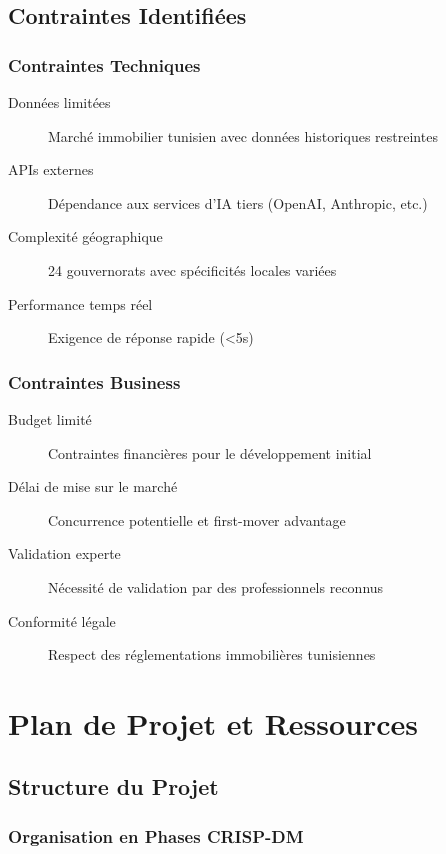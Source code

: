 \subsection{Contraintes Identifiées}
\label{subsec:contraintes}

\subsubsection{Contraintes Techniques}

\begin{description}
    \item[Données limitées] Marché immobilier tunisien avec données historiques restreintes
    \item[APIs externes] Dépendance aux services d'IA tiers (OpenAI, Anthropic, etc.)
    \item[Complexité géographique] 24 gouvernorats avec spécificités locales variées
    \item[Performance temps réel] Exigence de réponse rapide (<5s)
\end{description}

\subsubsection{Contraintes Business}

\begin{description}
    \item[Budget limité] Contraintes financières pour le développement initial
    \item[Délai de mise sur le marché] Concurrence potentielle et first-mover advantage
    \item[Validation experte] Nécessité de validation par des professionnels reconnus
    \item[Conformité légale] Respect des réglementations immobilières tunisiennes
\end{description}

\section{Plan de Projet et Ressources}
\label{sec:plan_projet}

\subsection{Structure du Projet}
\label{subsec:structure_projet}

\subsubsection{Organisation en Phases CRISP-DM}

